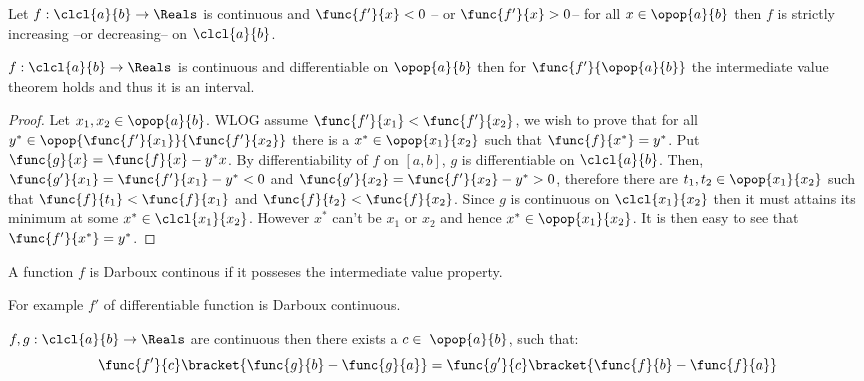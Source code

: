\begin{corollary}
    Let \(f: \clcl{a}{b} \to \Reals\) is continuous and \(\func{f'}{x} < 0\) -- or \(\func{f'}{x} > 0\)-- for all \(x \in \opop{a}{b}\) then \(f\) is strictly increasing --or decreasing--  on \(\clcl{a}{b}\).
\end{corollary}
\begin{theorem}
    \(f: \clcl{a}{b} \to \Reals\) is continuous and differentiable on \(\opop{a}{b}\) then for \(\func{f'}{\opop{a}{b}}\) the intermediate value theorem holds and thus it is an interval.
\end{theorem}
\begin{proof}
    Let \(x_1, x_2 \in \opop{a}{b} \). WLOG assume \(\func{f'}{x_1} < \func{f'}{x_2}\), we wish to prove that for all \(y^* \in \opop{\func{f'}{x_1}}{ \func{f'}{x_2}}\) there is a \(x^* \in \opop{x_1}{x_2} \) such that \(\func{f}{x^{\ast}} = y^{\ast}\). Put \(\func{g}{x} = \func{f}{x} - y^{\ast}x\). By differentiability of \(f\) on \([a,b]\), \(g\) is differentiable on \(\clcl{a}{b}\). Then, \(\func{g'}{x_1} = \func{f'}{x_1} - y^{\ast} < 0\) and \(\func{g'}{x_2} =  \func{f'}{x_2} - y^{\ast} > 0\), therefore there are \(t_1,t_2 \in \opop{x_1}{x_2}\) such that \(\func{f}{t_1} < \func{f}{x_1}\) and \(\func{f}{t_2} < \func{f}{x_2}\). Since \(g\) is continuous on \(\clcl{x_1}{x_2}\) then it must attains its minimum at some \(x^{\ast} \in \clcl{x_1}{x_2}\). However \(x^* \) can't be \(x_1\) or \(x_2\) and hence \(x^{\ast} \in \opop{x_1}{x_2}\). It is then easy to see that \(\func{f'}{x^{\ast}} = y^{\ast}\).
\end{proof}
\begin{definition}
    A function \(f\) is Darboux continous if it posseses the intermediate value property.
\end{definition}
For example \(f'\) of differentiable function is Darboux continuous.
\begin{theorem}
    \(f,g : \clcl{a}{b} \to \Reals\) are continuous then there exists a \(c \in \; \opop{a}{b}\), such that:
    \begin{equation*}
        \func{f'}{c}\bracket{\func{g}{b} - \func{g}{a}} = \func{g'}{c}\bracket{\func{f}{b} - \func{f}{a}}
    \end{equation*}
\end{theorem}
